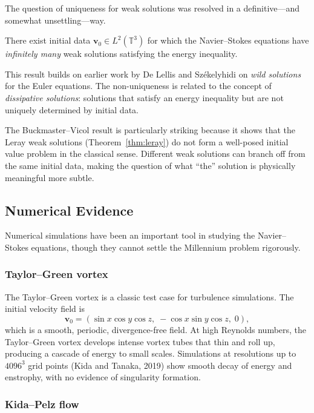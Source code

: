 The question of uniqueness for weak solutions was resolved in a definitive---and somewhat unsettling---way.

\begin{theorem}
\label{thm:buckmaster-vicol}
There exist initial data $\mathbf{v}_0 \in L^2(\mathbb{T}^3)$ for which the Navier--Stokes equations have \emph{infinitely many} weak solutions satisfying the energy inequality.
\end{theorem}

This result builds on earlier work by De Lellis and Sz\'{e}kelyhidi on \emph{wild solutions} for the Euler equations. The non-uniqueness is related to the concept of \emph{dissipative solutions}: solutions that satisfy an energy inequality but are not uniquely determined by initial data.

The Buckmaster--Vicol result is particularly striking because it shows that the Leray weak solutions (Theorem~\ref{thm:leray}) do not form a well-posed initial value problem in the classical sense. Different weak solutions can branch off from the same initial data, making the question of what ``the'' solution is physically meaningful more subtle.

\subsection{Numerical Evidence}

Numerical simulations have been an important tool in studying the Navier--Stokes equations, though they cannot settle the Millennium problem rigorously.

\subsubsection*{Taylor--Green vortex}

The Taylor--Green vortex is a classic test case for turbulence simulations. The initial velocity field is
\[
\mathbf{v}_0 = (\sin x \cos y \cos z, \; -\cos x \sin y \cos z, \; 0),
\]
which is a smooth, periodic, divergence-free field. At high Reynolds numbers, the Taylor--Green vortex develops intense vortex tubes that thin and roll up, producing a cascade of energy to small scales. Simulations at resolutions up to $4096^3$ grid points (Kida and Tanaka, 2019) show smooth decay of energy and enstrophy, with no evidence of singularity formation.

\subsubsection*{Kida--Pelz flow}

